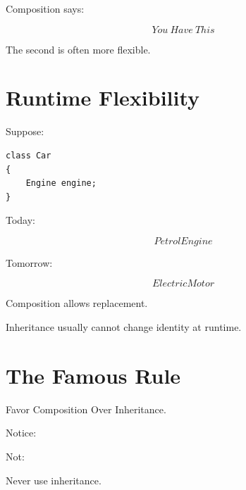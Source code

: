\documentclass[11pt,a4paper]{book}
\begin{document}
Composition says:

\[
You\ Have\ This
\]


The second is often more flexible.


\section{Runtime Flexibility}

Suppose:

\begin{verbatim}
class Car
{
    Engine engine;
}
\end{verbatim}


Today:

\[
PetrolEngine
\]


Tomorrow:

\[
ElectricMotor
\]


Composition allows replacement.


Inheritance usually cannot change identity
at runtime.


\section{The Famous Rule}

\begin{rosettarule}

Favor Composition Over Inheritance.

\end{rosettarule}


Notice:

Not:

\begin{center}
Never use inheritance.
\end{center}
\end{document}
